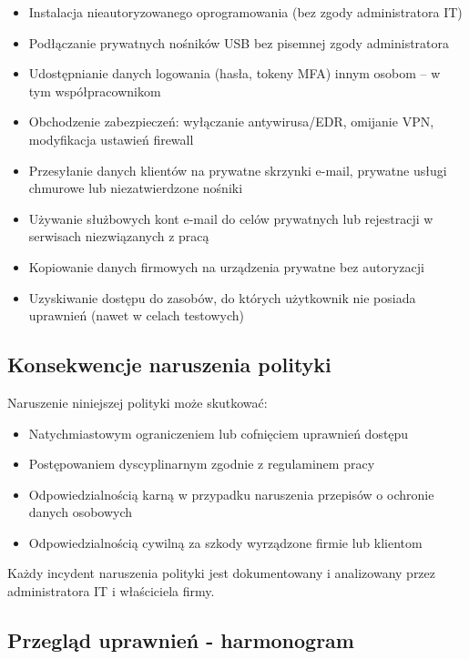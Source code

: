 \documentclass[12pt,a4paper]{article}
\providecommand{\tightlist}{\setlength{\itemsep}{0pt}\setlength{\parskip}{0pt}}
\begin{document}
\begin{itemize}
\tightlist
\item
  Instalacja nieautoryzowanego oprogramowania (bez zgody administratora IT)
\item
  Podłączanie prywatnych nośników USB bez pisemnej zgody administratora
\item
  Udostępnianie danych logowania (hasła, tokeny MFA) innym osobom -- w tym współpracownikom
\item
  Obchodzenie zabezpieczeń: wyłączanie antywirusa/EDR, omijanie VPN, modyfikacja ustawień firewall
\item
  Przesyłanie danych klientów na prywatne skrzynki e-mail, prywatne usługi chmurowe lub niezatwierdzone nośniki
\item
  Używanie służbowych kont e-mail do celów prywatnych lub rejestracji w serwisach niezwiązanych z pracą
\item
  Kopiowanie danych firmowych na urządzenia prywatne bez autoryzacji
\item
  Uzyskiwanie dostępu do zasobów, do których użytkownik nie posiada uprawnień (nawet w celach testowych)
\end{itemize}

\subsection{Konsekwencje naruszenia polityki}\label{konsekwencje-naruszenia}

Naruszenie niniejszej polityki może skutkować:

\begin{itemize}
\tightlist
\item
  Natychmiastowym ograniczeniem lub cofnięciem uprawnień dostępu
\item
  Postępowaniem dyscyplinarnym zgodnie z regulaminem pracy
\item
  Odpowiedzialnością karną w przypadku naruszenia przepisów o ochronie danych osobowych
\item
  Odpowiedzialnością cywilną za szkody wyrządzone firmie lub klientom
\end{itemize}

Każdy incydent naruszenia polityki jest dokumentowany i analizowany przez administratora IT i właściciela firmy.

\subsection{Przegląd uprawnień - harmonogram}\label{przeglad-uprawnien-harmonogram}
\end{document}
